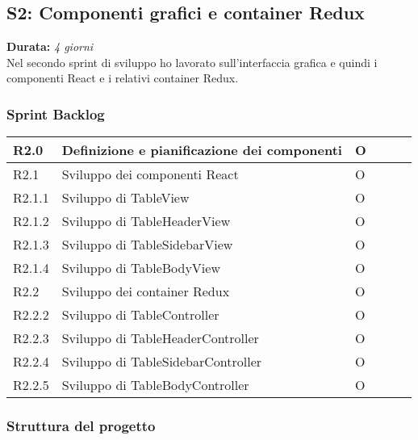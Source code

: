 \newpage

\subsection{S2: Componenti grafici e container Redux}
\textbf{Durata:} \textit{4 giorni} \\
Nel secondo sprint di sviluppo ho lavorato sull'interfaccia grafica e quindi i componenti React e i relativi container Redux.

\subsubsection{Sprint Backlog}
\begin{longtable} {
		|>{}p{10mm}| 
		|>{}p{90mm}|
		|>{}p{15mm}|
		|>{}p{15mm}|
		|>{}p{15mm}|
		>{}p{0mm}}
	\hline
R2.0   & \textbf{Definizione e pianificazione dei componenti} & O\\ \hline
R2.1   & Sviluppo dei componenti React 		  & O\\ \hline
R2.1.1 & Sviluppo di TableView                & O\\ \hline
R2.1.2 & Sviluppo di TableHeaderView          & O\\ \hline
R2.1.3 & Sviluppo di TableSidebarView         & O \\ \hline
R2.1.4 & Sviluppo di TableBodyView            & O\\ \hline
R2.2   & Sviluppo dei container Redux         & O  \\ \hline
R2.2.2 & Sviluppo di TableController          & O   \\ \hline
R2.2.3 & Sviluppo di TableHeaderController    & O      \\ \hline
R2.2.4 & Sviluppo di TableSidebarController   & O      \\ \hline
R2.2.5 & Sviluppo di TableBodyController      & O   \\ \hline
\end{longtable}
\subsubsection{Struttura del progetto}

